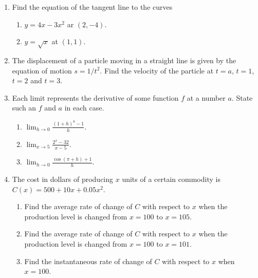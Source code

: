 


\allhandoutinfo{}

\begin{enumerate}
	\item 	Find the equation of the tangent line to the curves
		\begin{enumerate}
			\item $y=4x-3x^2$ ar $(2,-4)$.
			\vfill
			\item	$y = \sqrt{x}$ at $(1,1)$.
			\vfill
		\end{enumerate}
	
	\item 	The displacement of a particle moving in a straight line is given by the equation of motion $s=1/t^2$.
		Find the velocity of the particle at $t=a$, $t=1$, $t=2$ and $t=3$.

	\vfill
	\newpage

	\item	Each limit represents the derivative of some function $f$ at a number $a$. State such an $f$ and $a$ in each case.
		\begin{enumerate}
			\item	$\displaystyle\lim_{h \rightarrow 0} \frac{ (1+h)^8 - 1 }{h}$.
			\vfill
			\item	$\displaystyle\lim_{x \rightarrow 5} \frac{ 2^x - 32}{x-5}$.
			\vfill
			\item	$\displaystyle\lim_{h \rightarrow 0} \frac{ \cos(\pi + h) + 1 }{h}$.
			\vfill
		\end{enumerate}

	\newpage
	\item 	The cost in dollars of producing $x$ units of a certain commodity is $C(x)=  500 + 10x + 0.05 x^2$.
		\begin{enumerate}
			\item 	Find the average rate of change of $C$ with respect to $x$ when the production level is changed
					from $x=100$ to $x=105$.
			\vfill
			\item 	Find the average rate of change of $C$ with respect to $x$ when the production level is changed
					from $x=100$ to $x=101$.
			\vfill
			\item	Find the instantaneous rate of change of $C$ with respect to $x$ when $x=100$.
			\vfill
		\end{enumerate}
\end{enumerate}

